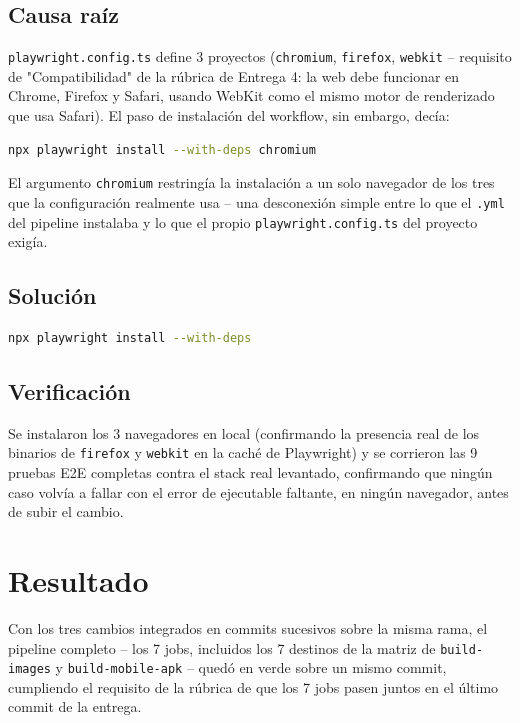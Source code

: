 \documentclass[11pt,letterpaper]{article}
\begin{document}
\subsection{Causa raíz}
\texttt{playwright.config.ts} define 3 proyectos (\texttt{chromium}, \texttt{firefox},
\texttt{webkit} -- requisito de "Compatibilidad" de la rúbrica de Entrega 4: la web debe
funcionar en Chrome, Firefox y Safari, usando WebKit como el mismo motor de renderizado que usa
Safari). El paso de instalación del workflow, sin embargo, decía:

\begin{lstlisting}[language=bash,caption={Paso de instalacion original, restringido a un solo navegador}]
npx playwright install --with-deps chromium
\end{lstlisting}

El argumento \texttt{chromium} restringía la instalación a un solo navegador de los tres que la
configuración realmente usa -- una desconexión simple entre lo que el \texttt{.yml} del pipeline
instalaba y lo que el propio \texttt{playwright.config.ts} del proyecto exigía.

\subsection{Solución}
\begin{lstlisting}[language=bash,caption={Correccion: sin argumento, instala los navegadores que la config usa}]
npx playwright install --with-deps
\end{lstlisting}

\subsection{Verificación}
Se instalaron los 3 navegadores en local (confirmando la presencia real de los binarios de
\texttt{firefox} y \texttt{webkit} en la caché de Playwright) y se corrieron las 9 pruebas E2E
completas contra el stack real levantado, confirmando que ningún caso volvía a fallar con el
error de ejecutable faltante, en ningún navegador, antes de subir el cambio.


\section{Resultado}

Con los tres cambios integrados en commits sucesivos sobre la misma rama, el pipeline completo --
los 7 jobs, incluidos los 7 destinos de la matriz de \texttt{build-images} y
\texttt{build-mobile-apk} -- quedó en verde sobre un mismo commit, cumpliendo el requisito de la
rúbrica de que los 7 jobs pasen juntos en el último commit de la entrega.
\end{document}
